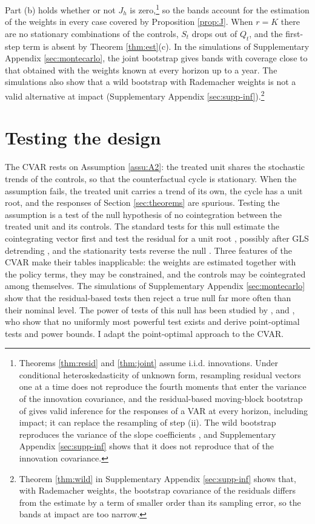 \documentclass[12pt,a4paper]{article}
\theoremstyle{definition}
\theoremstyle{definition}\newtheorem{example}{Example}
\theoremstyle{definition}\newtheorem{definition}{Definition}
\begin{document}
Part (b) holds whether or not $J_h$ is zero,\footnote{Theorems \ref{thm:resid} and \ref{thm:joint} assume i.i.d. innovations. Under conditional heteroskedasticity of unknown form, resampling residual vectors one at a time does not reproduce the fourth moments that enter the variance of the innovation covariance, and the residual-based moving-block bootstrap of \citet{bruggemann2016inference} gives valid inference for the responses of a VAR at every horizon, including impact; it can replace the resampling of step (ii). The wild bootstrap reproduces the variance of the slope coefficients \citep{goncalveskilian2004}, and Supplementary Appendix \ref{sec:supp-inf} shows that it does not reproduce that of the innovation covariance.} so the bands account for the estimation of the weights in every case covered by Proposition \ref{prop:J}. When $r=K$ there are no stationary combinations of the controls, $S_t$ drops out of $Q_t$, and the first-step term is absent by Theorem \ref{thm:est}(c). In the simulations of Supplementary Appendix \ref{sec:montecarlo}, the joint bootstrap gives bands with coverage close to that obtained with the weights known at every horizon up to a year. The simulations also show that a wild bootstrap with Rademacher weights is not a valid alternative at impact (Supplementary Appendix \ref{sec:supp-inf}).\footnote{Theorem \ref{thm:wild} in Supplementary Appendix \ref{sec:supp-inf} shows that, with Rademacher weights, the bootstrap covariance of the residuals differs from the estimate by a term of smaller order than its sampling error, so the bands at impact are too narrow.}

\section{Testing the design\label{sec:test}}

The CVAR rests on Assumption \ref{assu:A2}: the treated unit shares the stochastic trends of the controls, so that the counterfactual cycle is stationary. When the assumption fails, the treated unit carries a trend of its own, the cycle has a unit root, and the responses of Section \ref{sec:theorems} are spurious. Testing the assumption is a test of the null hypothesis of no cointegration between the treated unit and its controls. The standard tests for this null estimate the cointegrating vector first and test the residual for a unit root \citep{EngleGranger1987,PhillipsOuliaris1990}, possibly after GLS detrending \citep{PerronRodriguez2016}, and the stationarity tests reverse the null \citep{Shin1994,HarveyThiele2021}. Three features of the CVAR make their tables inapplicable: the weights are estimated together with the policy terms, they may be constrained, and the controls may be cointegrated among themselves. The simulations of Supplementary Appendix \ref{sec:montecarlo} show that the residual-based tests then reject a true null far more often than their nominal level. The power of tests of this null has been studied by \citet{Pesavento2004}, \citet{ElliottJanssonPesavento2005} and \citet{ElliottPesavento2009}, who show that no uniformly most powerful test exists and derive point-optimal tests and power bounds. I adapt the point-optimal approach to the CVAR.
\end{document}
